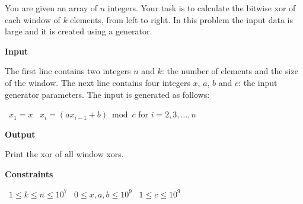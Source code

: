 You are given an array of $n$ integers. Your task is to calculate the bitwise xor of each window of $k$ elements, from left to right.
In this problem the input data is large and it is created using a generator.

\vspace{0.3cm}\noindent\textbf{Input}

The first line contains two integers $n$ and $k$: the number of elements and the size of the window.
The next line contains four integers $x$, $a$, $b$ and $c$: the input generator parameters. The input is generated as follows:

\textbullet\ $x_1=x$
\textbullet\ $x_i=(ax_{i-1}+b) \bmod c$ for $i=2,3,\dots,n$

\vspace{0.3cm}\noindent\textbf{Output}

Print the xor of all window xors.

\vspace{0.3cm}\noindent\textbf{Constraints}

\textbullet\ $1 \le k \le n \le 10^7$
\textbullet\ $0 \le x, a, b \le 10^9$
\textbullet\ $1 \le c \le 10^9$